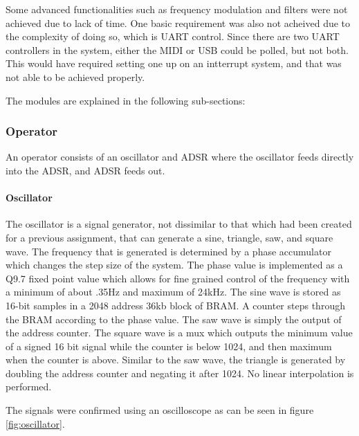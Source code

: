 \documentclass[12pt]{article}
\begin{document}
Some advanced functionalities such as frequency modulation and filters were not achieved due to lack of time. One basic requirement was also not acheived due to the complexity of doing so, which is UART control. Since there are two UART controllers in the system, either the MIDI or USB could be polled, but not both. This would have required setting one up on an intterrupt system, and that was not able to be achieved properly.

The modules are explained in the following sub-sections:

\subsubsection{Operator}

An operator consists of an oscillator and ADSR where the oscillator feeds directly into the ADSR, and ADSR feeds out.

\paragraph{Oscillator}

The oscillator is a signal generator, not dissimilar to that which had been created for a previous assignment, that can generate a sine, triangle, saw, and square wave. The frequency that is generated is determined by a phase accumulator which changes the step size of the system. The phase value is implemented as a Q9.7 fixed point value which allows for fine grained control of the frequency with a minimum of about .35Hz and maximum of 24kHz. The sine wave is stored as 16-bit samples in a 2048 address 36kb block of BRAM. A counter steps through the BRAM according to the phase value. The saw wave is simply the output of the address counter. The square wave is a mux which outputs the minimum value of a signed 16 bit signal while the counter is below 1024, and then maximum when the counter is above. Similar to the saw wave, the triangle is generated by doubling the address counter and negating it after 1024. No linear interpolation is performed.

The signals were confirmed using an oscilloscope as can be seen in figure \ref{fig:oscillator}.
\end{document}
